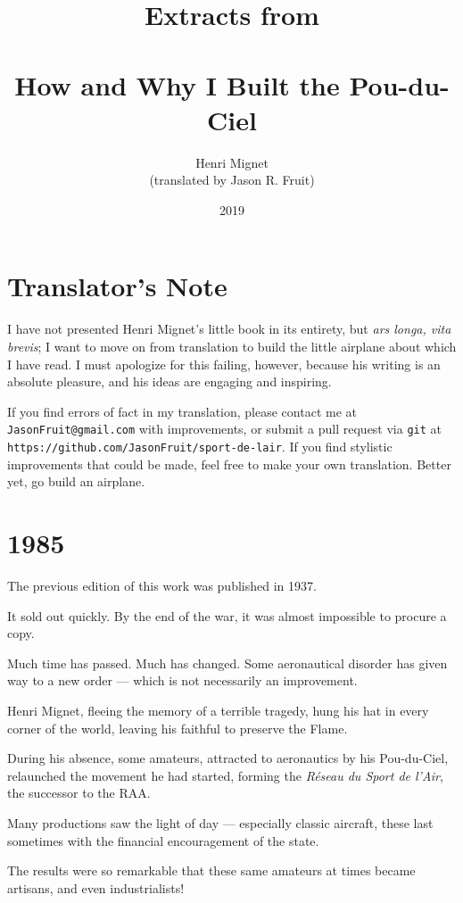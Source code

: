 \documentclass{book}
\title{{\small Extracts from}\\ \vspace{12pt}{\Huge Aerial
    Sport}\\{\Large How and Why I Built the Pou-du-Ciel}}
\author{Henri Mignet\\
  {\small (translated by Jason R. Fruit)}}
\date{2019}
\begin{document}
\maketitle
\tableofcontents

\selectfont

\chapter*{Translator's Note}

I have not presented Henri Mignet's little book in its entirety, but
\textit{ars longa, vita brevis}; I want to move on from translation to
build the little airplane about which I have read.  I must apologize
for this failing, however, because his writing is an absolute
pleasure, and his ideas are engaging and inspiring.

If you find errors of fact in my translation, please contact me at
\texttt{JasonFruit@gmail.com} with improvements, or submit a pull
request via \texttt{git} at
\texttt{https://github.com/JasonFruit/sport-de-lair}.  If you find
stylistic improvements that could be made, feel free to make your own
translation.  Better yet, go build an airplane.

\chapter*{1985}

The previous edition of this work was published in 1937.

It sold out quickly.  By the end of the war, it was almost impossible
to procure a copy.

Much time has passed.  Much has changed.  Some aeronautical disorder
has given way to a new order --- which is not necessarily an
improvement.

Henri Mignet, fleeing the memory of a terrible tragedy, hung his hat
in every corner of the world, leaving his faithful to preserve the
Flame.

During his absence, some amateurs, attracted to aeronautics by his
Pou-du-Ciel, relaunched the movement he had started, forming the
\textit{R\'eseau du Sport de l'Air}, the successor to the RAA.

Many productions saw the light of day --- especially classic aircraft,
these last sometimes with the financial encouragement of the state.

The results were so remarkable that these same amateurs at times
became artisans, and even industrialists!
\end{document}
